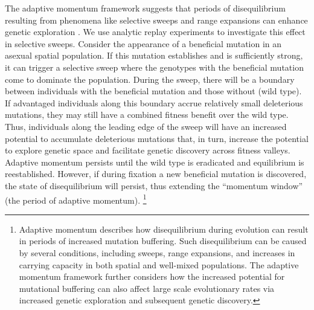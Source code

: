 The adaptive momentum framework suggests that periods of disequilibrium resulting from phenomena like selective sweeps and range expansions can enhance genetic exploration \citep{Bohm2024.04.08.588357}. 
We use analytic replay experiments to investigate this effect in selective sweeps.
Consider the appearance of a beneficial mutation in an asexual spatial population. 
If this mutation establishes and is sufficiently strong, it can trigger a selective sweep where the genotypes with the beneficial mutation come to dominate the population.
During the sweep, there will be a boundary between individuals with the beneficial mutation and those without (wild type).
If advantaged individuals along this boundary accrue relatively small deleterious mutations, they may still have a combined fitness benefit over the wild type. 
Thus, individuals along the leading edge of the sweep will have an increased potential to accumulate deleterious mutations that, in turn, increase the potential to explore genetic space and facilitate genetic discovery across fitness valleys. 
Adaptive momentum persists until the wild type is eradicated and equilibrium is reestablished. 
However, if during fixation a new beneficial mutation is discovered, the state of disequilibrium will persist, thus extending the ``momentum window'' (the period of adaptive momentum). 
\footnote{Adaptive momentum describes how disequilibrium during evolution can result in periods of increased mutation buffering. Such disequilibrium can be caused by several conditions, including sweeps, range expansions, and increases in carrying capacity in both spatial and well-mixed populations. The adaptive momentum framework further considers how the increased potential for mutational buffering can also affect large scale evolutionary rates via increased genetic exploration and subsequent genetic discovery.}



